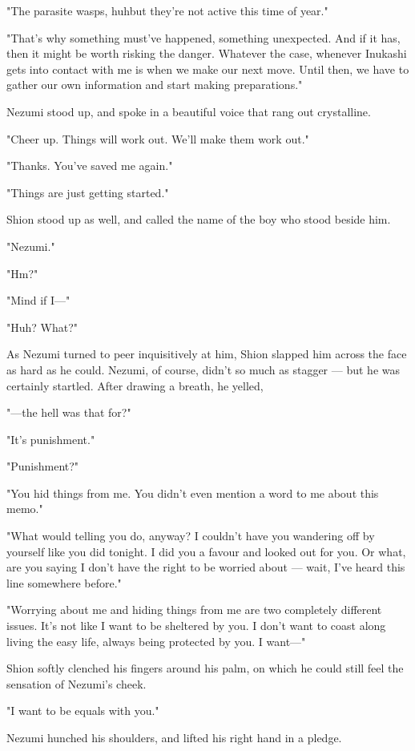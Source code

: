 "The parasite wasps, huh\el but they're not active this time of year."

"That's why something must've happened, something unexpected. And if it
has, then it might be worth risking the danger. Whatever the case,
whenever Inukashi gets into contact with me is when we make our next
move. Until then, we have to gather our own information and start making
preparations."

Nezumi stood up, and spoke in a beautiful voice that rang out
crystalline.

"Cheer up. Things will work out. We'll make them work out."

"Thanks. You've saved me again."

"Things are just getting started."

Shion stood up as well, and called the name of the boy who stood beside
him.

"Nezumi."

"Hm?"

"Mind if I---"

"Huh? What?"

As Nezumi turned to peer inquisitively at him, Shion slapped him across
the face as hard as he could. Nezumi, of course, didn't so much as
stagger --- but he was certainly startled. After drawing a breath, he
yelled,

"---the hell was that for?"

"It's punishment."

"Punishment?"

"You hid things from me. You didn't even mention a word to me about this
memo."

"What would telling you do, anyway? I couldn't have you wandering off by
yourself like you did tonight. I did you a favour and looked out for
you. Or what, are you saying I don't have the right to be worried about
--- wait, I've heard this line somewhere before."

"Worrying about me and hiding things from me are two completely
different issues. It's not like I want to be sheltered by you. I don't
want to coast along living the easy life, always being protected by you.
I want---"

Shion softly clenched his fingers around his palm, on which he could
still feel the sensation of Nezumi's cheek.

"I want to be equals with you."

Nezumi hunched his shoulders, and lifted his right hand in a pledge.

